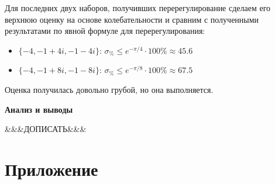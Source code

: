 Для последних двух наборов, получивших перерегулирование сделаем его верхнюю оценку на основе колебательности и сравним с полученными результатами по явной формуле для перерегулирования:


\begin{itemize}
\setlength{\itemsep}{-1ex}
   \item{\begin{flushleft} $\lbrace -4,-1+4i,-1-4i\rbrace$: $\sigma_{\%} \le e^{-\pi /4} \cdot 100\%\approx 45.6$ \end{flushleft}}
   \item{\begin{flushleft} $\lbrace -4,-1+8i,-1-8i\rbrace$: $\sigma_{\%} \le e^{-\pi /8} \cdot 100\%\approx 67.5$ \end{flushleft}}
\end{itemize}

Оценка получилась довольно грубой, но она выполняется.


\textbf{Анализ и выводы}


\begin{par}
\begin{flushleft}
\&\&\&ДОПИСАТЬ\&\&\&
\end{flushleft}
\end{par}




\section{Приложение}

